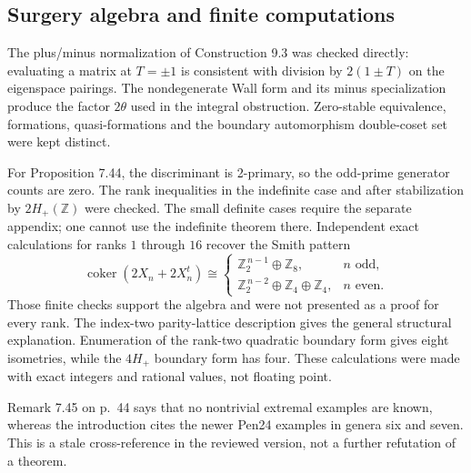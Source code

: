 \documentclass[10pt]{article}
\begin{document}
\subsection*{Surgery algebra and finite computations}
The plus/minus normalization of Construction 9.3 was checked directly: evaluating a matrix at \(T=\pm1\) is consistent with division by \(2(1\pm T)\) on the eigenspace pairings. The nondegenerate Wall form and its minus specialization produce the factor \(2\theta\) used in the integral obstruction. Zero-stable equivalence, formations, quasi-formations and the boundary automorphism double-coset set were kept distinct.\par
For Proposition 7.44, the discriminant is 2-primary, so the odd-prime generator counts are zero. The rank inequalities in the indefinite case and after stabilization by \(2H_+(\mathbb Z)\) were checked. The small definite cases require the separate appendix; one cannot use the indefinite theorem there. Independent exact calculations for ranks \(1\) through \(16\) recover the Smith pattern \[\mathop{\mathrm{coker}}(2X_n+2X_n^t)\cong
 \begin{cases}
  \mathbb Z_2^{\,n-1}\oplus\mathbb Z_8,&n\text{ odd},\\
  \mathbb Z_2^{\,n-2}\oplus\mathbb Z_4\oplus\mathbb Z_4,&n\text{ even}.
 \end{cases}\] Those finite checks support the algebra and were not presented as a proof for every rank. The index-two parity-lattice description gives the general structural explanation. Enumeration of the rank-two quadratic boundary form gives eight isometries, while the \(4H_+\) boundary form has four. These calculations were made with exact integers and rational values, not floating point.\par
Remark 7.45 on p. 44 says that no nontrivial extremal examples are known, whereas the introduction cites the newer Pen24 examples in genera six and seven. This is a stale cross-reference in the reviewed version, not a further refutation of a theorem.\par
\end{document}
